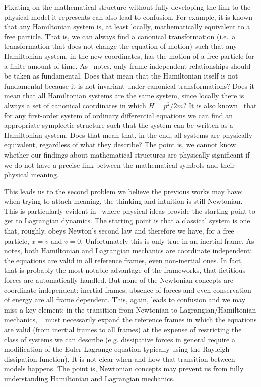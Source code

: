 \documentclass[11pt]{elsarticle}
\begin{document}
Fixating on the mathematical structure without fully developing the link to the physical model it represents can also lead to confusion. For example, it is known~\cite{AllHamFreeParticle} that any Hamiltonian system is, at least locally, mathematically equivalent to a free particle. That is, we can always find a canonical transformation (i.e.~a transformation that does not change the equation of motion) such that any Hamiltonian system, in the new coordinates, has the motion of a free particle for a finite amount of time. As~\cite{North} notes, only frame-independent relationships should be taken as fundamental. Does that mean that the Hamiltonian itself is not fundamental because it is not invariant under canonical transformations? Does it mean that all Hamiltonian systems are the same system, since locally there is always a set of canonical coordinates in which $H=p^2/2m$? It is also known~\cite{AllSystemsAreHam} that for any first-order system of ordinary differential equations we can find an appropriate symplectic structure such that the system can be written as a Hamiltonian system. Does that mean that, in the end, all systems are physically equivalent, regardless of what they describe? The point is, we cannot know whether our findings about mathematical structures are physically significant if we do not have a precise link between the mathematical symbols and their physical meaning.

This leads us to the second problem we believe the previous works may have: when trying to attach meaning, the thinking and intuition is still Newtonian. This is particularly evident in~\cite{Curiel} where physical ideas provide the starting point to get to Lagrangian dynamics. The starting point is that a classical system is one that, roughly, obeys Newton's second law and therefore we have, for a free particle, $\dot{x} = v$ and $\dot{v} = 0$. Unfortunately this is only true in an inertial frame. As~\cite{North} notes, both Hamiltonian and Lagrangian mechanics are coordinate independent: the equations are valid in all reference frames, even non-inertial ones. In fact, that is probably the most notable advantage of the frameworks, that fictitious forces are automatically handled. But none of the Newtonian concepts are coordinate independent: inertial frames, absence of forces and even conservation of energy are all frame dependent. This, again, leads to confusion and we may miss a key element: in the transition from Newtonian to Lagrangian/Hamiltonian mechanics, ~\cite{Curiel} must necessarily expand the reference frames in which the equations are valid (from inertial frames to all frames) at the expense of restricting the class of systems we can describe (e.g. dissipative forces in general require a modification of the Euler-Lagrange equation typically using the Rayleigh dissipation function). It is not clear when and how that transition between models happens. The point is, Newtonian concepts may prevent us from fully understanding Hamiltonian and Lagrangian mechanics.
\end{document}
